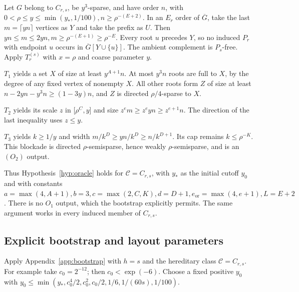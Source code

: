 \documentclass[11pt,a4paper]{article}
\theoremstyle{definition}
\theoremstyle{remark}
\numberwithin{equation}{section}
\begin{document}
Let \(G\) belong to \(C_{r,\allowbreak s}\), be \(y^{3}\)-sparse, and have order \(n\), with \(0<\rho\le\allowbreak y\le\allowbreak \min (y_{*},\allowbreak 1/100),\allowbreak  n\ge\allowbreak \rho^{-(E+2)}\). In an \(E_{r}\) order of \(\overline{G}\), take the last \(m=\lceil yn\rceil\) vertices as \(Y\) and take the prefix as \(U\). Then \(yn\le\allowbreak m\le\allowbreak 2yn,\allowbreak  m\ge\allowbreak \rho^{-(E+1)}\ge\allowbreak \rho^{-E}\). Every root \(u\) precedes \(Y\), so no induced \(P_{r}\) with endpoint \(u\) occurs in \(\overline{G}[Y\cup\{u\}]\). The ambient complement is \(P_{s}\)-free. Apply \(T_{r}^{(s)}\) with \(x=\rho\) and coarse parameter \(y\).

\(T_{1}\) yields a set \(X\) of size at least \(y^{A+1}n\). At most \(y^{3} n\) roots are full to \(X\), by the degree of any fixed vertex of nonempty \(X\). All other roots form \(Z\) of size at least \(n-2yn-y^{3} n\ge\allowbreak (1-3y)n\), and \(Z\) is directed \(\rho/4\)-sparse to \(X\).

\(T_{2}\) yields its scale \(z\) in [\(\rho^{C},\allowbreak y\)] and size \(z^{e} m\ge\allowbreak z^{e} y n\ge\allowbreak z^{e+1}n\). The direction of the last inequality uses \(z\le\allowbreak y\).

\(T_{3}\) yields \(k\ge\allowbreak 1/y\) and width \(m/k^{D}\ge\allowbreak yn/k^{D}\ge\allowbreak n/k^{D+1}\). Its cap remains \(k\le\allowbreak \rho^{-K}\). This blockade is directed \(\rho\)-semisparse, hence weakly \(\rho\)-semisparse, and is an \((O_{2})\) output.

Thus Hypothesis~\ref{hyp:oracle} holds for \(\mathcal C=C_{r,s}\), with \(y_{*}\) as the initial cutoff \(y_{0}\) and with constants \(a=\max (4,\allowbreak A+1),\allowbreak  b=3,\allowbreak  c=\max (2,\allowbreak C,\allowbreak K),\allowbreak  d=D+1,\allowbreak  e_{\mathrm{or}}=\max (4,\allowbreak e+1),\allowbreak  L=E+2\). There is no \(O_{1}\) output, which the bootstrap explicitly permits. The same argument works in every induced member of \(C_{r,\allowbreak s}\).
\subsection{Explicit bootstrap and layout parameters}\label{subsec:tail-parameters}
Apply Appendix~\ref{app:bootstrap} with \(h=s\) and the hereditary class \(\mathcal C=C_{r,s}\). For example take \(c_{0}=2^{-12}\); then \(c_{0}<\exp (-6)\). Choose a fixed positive \(y_{0}\) with \(y_{0}\le\allowbreak \min (y_{*},\allowbreak c_{0}^{4}/2,\allowbreak c_{0}^{2},\allowbreak c_{0}/2,\allowbreak 1/6,\allowbreak 1/(60s),\allowbreak 1/100)\).
\end{document}
